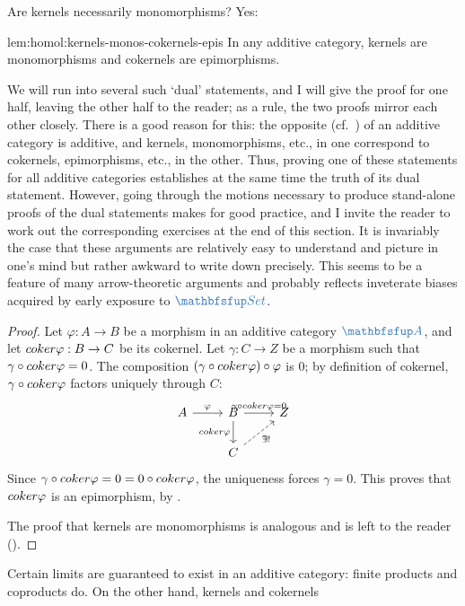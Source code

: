 Are kernels necessarily monomorphisms? Yes:
\begin{lem}{}{lem:homol:kernels-monos-cokernels-epis}
  In any additive category, kernels are monomorphisms and cokernels
  are epimorphisms.
\end{lem}
We will run into several such `dual' statements, and I will give the
proof for one half, leaving the other half to the reader; as a rule,
the two proofs mirror each other closely. There is a good reason for
this: the opposite (cf.\ ) of an
additive category is additive, and kernels, monomorphisms, etc., in
one correspond to cokernels, epimorphisms, etc., in the other. Thus,
proving one of these statements for all additive categories
establishes at the same time the truth of its dual statement.
However, going through the motions necessary to produce stand-alone
proofs of the dual statements makes for good practice, and I invite
the reader to work out the corresponding exercises at the end of this
section. It is invariably the case that these arguments are relatively
easy to understand and picture in one's mind but rather awkward to
write down precisely. This seems to be a feature of many
arrow-theoretic arguments and probably reflects inveterate biases
acquired by early exposure to $\categ{Set}$.
\begin{proof}
  Let $\varphi : A \to B$ be a morphism in an additive category
  $\categ{A}$, and let $coker\varphi : B \to C$ be its cokernel. Let
  $\gamma : C \to Z$ be a morphism such that
  $\gamma \circ coker\varphi = 0$. The composition
  $(\gamma \circ coker\varphi) \circ \varphi$ is $0$; by definition
  of cokernel, $\gamma \circ coker\varphi$ factors uniquely through
  $C$:
  \[\begin{tikzcd}
      A \arrow[r, "\varphi"] & B \arrow[r, "\gamma \circ \coker\varphi
      = 0"]
      \arrow[d, "\coker\varphi"'] & Z \\
      & C \arrow[ur, dashed, "\gamma"', "\exists!"']
    \end{tikzcd}\] Since
  $\gamma \circ coker\varphi = 0 = 0 \circ coker\varphi$, the
  uniqueness forces $\gamma = 0$.  This proves that $coker\varphi$ is
  an epimorphism, by .

  The proof that kernels are monomorphisms is analogous and is left to
  the reader ().
\end{proof}
Certain limits are guaranteed to exist in an additive category: finite
products and coproducts do. On the other hand, kernels and cokernels
